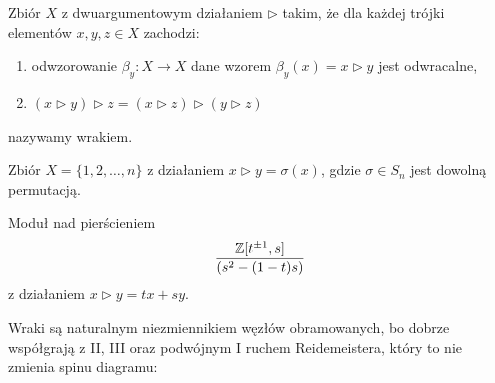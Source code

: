 \begin{definition}[wrak]
%
    Zbiór $X$ z dwuargumentowym działaniem $\triangleright$ takim, że dla każdej trójki elementów $x, y, z \in X$ zachodzi:
    \begin{enumerate}
        \item odwzorowanie $\beta_y \colon X \to X$ dane wzorem $\beta_y(x) = x \triangleright y$ jest odwracalne,
        \item $(x \triangleright y) \triangleright z = (x \triangleright z) \triangleright (y \triangleright z)$
    \end{enumerate}
    nazywamy wrakiem.
\end{definition}

\begin{example}
    Zbiór $X = \{1, 2, \ldots, n\}$ z działaniem $x \triangleright y = \sigma(x)$, gdzie $\sigma \in S_n$ jest dowolną permutacją.
\end{example}

\begin{example}
    Moduł nad pierścieniem
    \begin{equation}
        \frac{\mathbb Z[t^{\pm 1}, s]}{(s^2 - (1-t)s)}
    \end{equation}
    z działaniem $x \triangleright y = tx+sy$.
\end{example}

Wraki są naturalnym niezmiennikiem węzłów obramowanych, bo dobrze współgrają z II, III oraz podwójnym I ruchem Reidemeistera, który to nie zmienia spinu diagramu:

